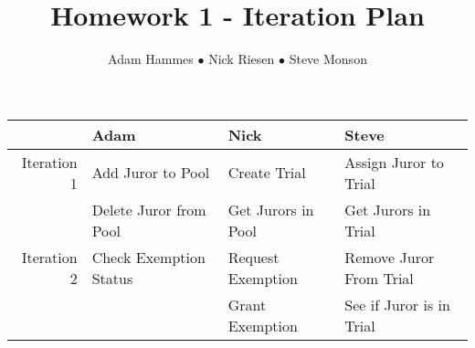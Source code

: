 \documentclass[10pt]{article}
\title{\vspace{.5in}Homework 1 - Iteration Plan}
\author{Adam Hammes $\bullet$ Nick Riesen $\bullet$ Steve Monson}
\begin{document}
\maketitle

\begin{center}
\begin{tabular}{| r | l | l | l |}
    \hline             & Adam                   & Nick               & Steve \\
    \hline Iteration 1 & Add Juror to Pool      & Create Trial       & Assign Juror to Trial \\
                       & Delete Juror from Pool & Get Jurors in Pool & Get Jurors in Trial \\
    \hline Iteration 2 & Check Exemption Status & Request Exemption  & Remove Juror From Trial \\
                       &                        & Grant Exemption    & See if Juror is in Trial \\
    \hline
\end{tabular}
\end{center}
\end{document}
